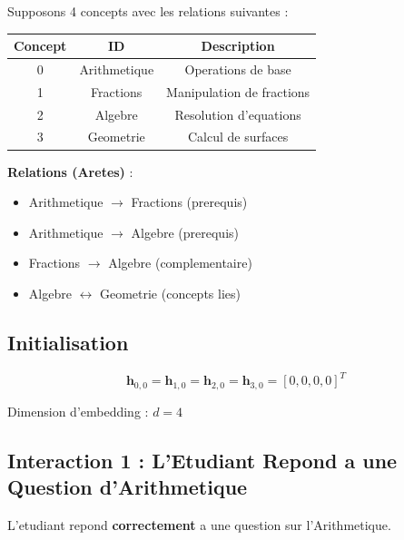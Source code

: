 \documentclass[11pt, a4paper]{article}
\begin{document}
Supposons 4 concepts avec les relations suivantes :

\begin{center}
    \begin{tabular}{|c|c|c|}
        \hline
        \textbf{Concept} & \textbf{ID}  & \textbf{Description}      \\
        \hline
        0                & Arithmetique & Operations de base        \\
        1                & Fractions    & Manipulation de fractions \\
        2                & Algebre      & Resolution d'equations    \\
        3                & Geometrie    & Calcul de surfaces        \\
        \hline
    \end{tabular}
\end{center}

\textbf{Relations (Aretes)} :
\begin{itemize}
    \item Arithmetique $\rightarrow$ Fractions (prerequis)
    \item Arithmetique $\rightarrow$ Algebre (prerequis)
    \item Fractions $\rightarrow$ Algebre (complementaire)
    \item Algebre $\leftrightarrow$ Geometrie (concepts lies)
\end{itemize}

\subsection{Initialisation}

\begin{equation}
    \mathbf{h}_{0,0} = \mathbf{h}_{1,0} = \mathbf{h}_{2,0} = \mathbf{h}_{3,0} = [0, 0, 0, 0]^T
\end{equation}

Dimension d'embedding : $d = 4$

\subsection{Interaction 1 : L'Etudiant Repond a une Question d'Arithmetique}

L'etudiant repond \textbf{correctement} a une question sur l'Arithmetique.
\end{document}
